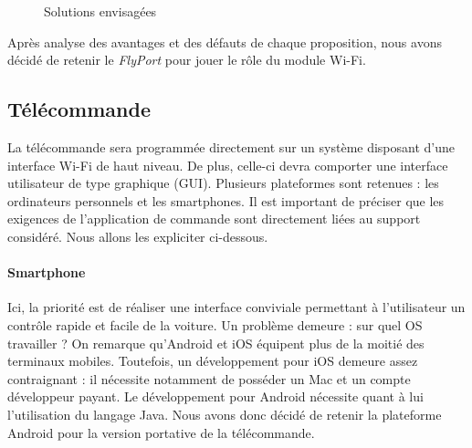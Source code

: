 \documentclass[a4paper,12pt]{report}
\begin{document}
\begin{figure}[!h]
  \centering
  \hspace{20pt}
  \caption{Solutions envisagées}
  \label{fig:animals}
\end{figure}

\bigskip
Après analyse des avantages et des défauts de chaque proposition, nous avons décidé de retenir le \emph{FlyPort} pour jouer le rôle du module Wi-Fi.

		\subsection{Télécommande}
		La télécommande sera programmée directement sur un système  disposant d’une interface Wi-Fi de haut niveau. De plus, celle-ci devra comporter une interface utilisateur de type graphique (GUI). Plusieurs plateformes sont retenues : les ordinateurs personnels et les smartphones. Il est important de préciser que les exigences de l’application de commande sont directement liées au support considéré. Nous allons les expliciter ci-dessous.
		
			\paragraph{Smartphone}
			Ici, la priorité est de réaliser une interface conviviale permettant à l’utilisateur un contrôle rapide et facile de la voiture. Un problème demeure : sur quel OS travailler ? On remarque qu’Android et iOS équipent plus de la moitié des terminaux mobiles. Toutefois, un développement pour iOS demeure assez contraignant : il nécessite notamment de posséder un Mac et un compte développeur payant. Le développement pour Android nécessite quant à lui l’utilisation du langage Java. Nous avons donc décidé de retenir la plateforme Android pour la version portative de la télécommande.
			
\end{document}
